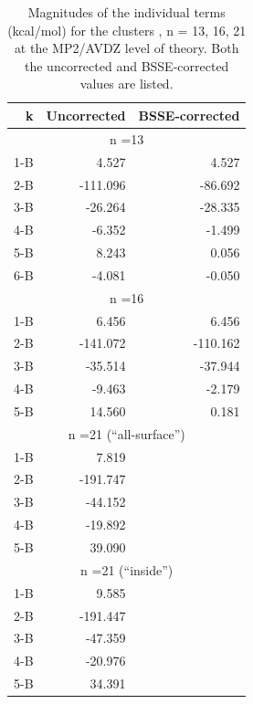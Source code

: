 \documentclass [11pt, proquest] {uwthesis}[2020/02/24]
\begin{document}
\begin{table}[]
\centering
\begin{tabular}{@{}rrr@{}}
\toprule
k       & Uncorrected     & BSSE-corrected     \\ \midrule
\multicolumn{3}{c}{n =13}                      \\
\hline
1-B     & 4.527           & 4.527              \\
2-B     & -111.096        & -86.692            \\
3-B     & -26.264         & -28.335            \\
4-B     & -6.352          & -1.499             \\
5-B     & 8.243           & 0.056              \\
6-B     & -4.081          & -0.050             \\
\hline
\multicolumn{3}{c}{n =16}                      \\
\hline
1-B     & 6.456           & 6.456              \\
2-B     & -141.072        & -110.162           \\
3-B     & -35.514         & -37.944            \\
4-B     & -9.463          & -2.179             \\
5-B     & 14.560          & 0.181              \\
\hline
\multicolumn{3}{c}{n =21 					(“all-surface”)} \\
\hline
1-B     & 7.819           &                    \\
2-B     & -191.747        &                    \\
3-B     & -44.152         &                    \\
4-B     & -19.892         &                    \\
5-B     & 39.090          &                    \\
\hline
\multicolumn{3}{c}{n =21 (“inside”)}           \\
\hline
1-B     & 9.585           &                    \\
2-B     & -191.447        &                    \\
3-B     & -47.359         &                    \\
4-B     & -20.976         &                    \\
5-B     & 34.391          &                    \\ \bottomrule
\end{tabular}
\caption{Magnitudes of the individual terms (kcal/mol) for the clusters , n = 13, 16, 21 at the MP2/AVDZ level of theory. Both the uncorrected and BSSE-corrected values are listed.}
\label{tab:MBE_I_T2}
\end{table}
\end{document}
